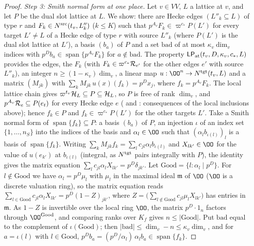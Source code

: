 \begin{proof}
\emph{Step 3: Smith normal form at one place.} Let $v\in VV$, $L$ a lattice at $v$, and let $P$ be the dual slot lattice at $L$.
We show: there are Hecke edges $(L''_k\subseteq L)$ of type $r$ and $F_k\in N^{\mathrm{src}}(t_v,L''_k)$ ($k\le K$) such that
$p^{A_v}F_k\in\varpi^{c_*}P(L')$ for every target $L'\ne L$ of a Hecke edge of type $r$ with source $L''_k$ (where $P(L')$ is
the dual slot lattice at $L'$), a basis $(b_a)$ of $P$ and a set $\mathrm{bad}$ of at most $\kappa_v\dim_v$ indices with
$p^Db_a\in\operatorname{span}\{p^{A_v}F_k\}$ for $a\notin\mathrm{bad}$. The property $\mathsf{LP}_{\mathrm{at}}(t_v,D,\kappa_v,c_*,L)$ provides
the edges, the $F_k$ (with $F_k\in\varpi^{c_*}\mathcal R_{e'}$ for the other edges $e'$ with source $L''_k$), an integer
$n\ge(1-\kappa_v)\dim_v$, a linear map $u:\OO^n\to\linkGNt(t_v,L)$ and a matrix $(M_{jk})$ with
$\sum_kM_{jk}\,u(x)(f_k)=p^Dx_j$, where $f_k=p^{A_v}F_k$. The local lattice chain gives
$\varpi^{t_v}\mathcal H_L\subseteq P\subseteq\mathcal H_L$, so $P$ is free of rank $\dim_v$, and $p^{A_v}\mathcal R_e\subseteq P(e_t)$ for
every Hecke edge $e$ ( and :
consequences of the local inclusions above); hence $f_k\in P$ and $f_k\in\varpi^{c_*}P(L')$ for the other targets $L'$. Take
a Smith normal form of $\operatorname{span}\{f_k\}\subseteq P$: a basis $(b_a)$ of $P$, an injection $\iota$ of an index set
$\{1,\dots,n_S\}$ into the indices of the basis and $\alpha_l\in\OO$ such that $(\alpha_lb_{\iota(l)})_l$ is a basis of
$\operatorname{span}\{f_k\}$. Writing $\sum_kM_{jk}f_k=\sum_lc_{jl}\alpha_lb_{\iota(l)}$ and $X_{lk'}\in\OO$ for the value of
$u(e_{k'})$ at $b_{\iota(l)}$ (integral, as $N^{\mathrm{tgt}}$ pairs integrally with $P$), the identity gives the matrix equation
$\sum_lc_{jl}\alpha_lX_{lk'}=p^D\delta_{jk'}$. Let $\mathrm{Good}=\{l:\alpha_l\mid p^D\}$. For $l\notin\mathrm{Good}$ we have
$\alpha_l=p^D\mu_l$ with $\mu_l$ in the maximal ideal $\mathfrak m$ of $\OO$ ($\OO$ is a discrete valuation ring), so the matrix
equation reads $\sum_{l\in\mathrm{Good}}c_{jl}\alpha_lX_{lk'}=p^D(1-Z)_{jk'}$, where $Z=\bigl(\sum_{l\notin\mathrm{Good}}c_{jl}\mu_l
X_{lk'}\bigr)$ has entries in $\mathfrak m$. As $1-Z$ is invertible over the local ring $\OO$, the matrix $p^D\cdot1_n$ factors
through $\OO^{\mathrm{Good}}$, and comparing ranks over $K_f$ gives $n\le|\mathrm{Good}|$. Put $\mathrm{bad}$ equal to the
complement of $\iota(\mathrm{Good})$; then
$|\mathrm{bad}|\le\dim_v-n\le\kappa_v\dim_v$, and for $a=\iota(l)$ with $l\in\mathrm{Good}$,
$p^Db_a=(p^D/\alpha_l)\,\alpha_lb_a\in\operatorname{span}\{f_k\}$.


\end{proof}
